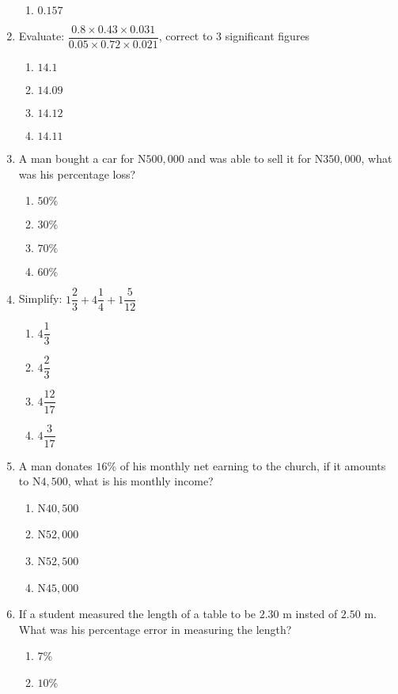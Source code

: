 \begin{multicols}{2}
\begin{enumerate}[label={\arabic*.}]
\begin{enumerate}[label={\Alph*.}]
    \item \(0.157\)
    \end{enumerate}
\item Evaluate: \(\dfrac{0.8 \times 0.43 \times 0.031}{0.05 \times 0.72 \times 0.021}\), correct to 3 significant figures
    \begin{enumerate}[label={\Alph*.}]
    \item \(14.1\)
    \item \(14.09\)
    \item \(14.12\)
    \item \(14.11\)
    \end{enumerate}
\item A man bought a car for N\(500, 000\) and was able to sell it for N\(350, 000\), what was his percentage loss?
    \begin{enumerate}[label={\Alph*.}]
    \item \(50\%\)
    \item \(30\%\)
    \item \(70\%\)
    \item \(60\%\)
    \end{enumerate}
\item Simplify: \(1{\dfrac{2}{3}} + 4{\dfrac{1}{4}} + 1{\dfrac{5}{12}}\)
    \begin{enumerate}[label={\Alph*.}]
    \item \(4\dfrac{1}{3}\)
    \item \(4\dfrac{2}{3}\)
    \item \(4\dfrac{12}{17}\)
    \item \(4\dfrac{3}{17}\)
    \end{enumerate}
\item A man donates \(16\%\) of his monthly net earning to the church, if it amounts to N\(4,500\), 
what is his monthly income? 
    \begin{enumerate}[label={\Alph*.}]
    \item N\(40,500\)
    \item N\(52,000\)
    \item N\(52,500\)
    \item N\(45,000\)
    \end{enumerate}
\item If a student measured the length of a table to be \(2.30\) m insted of \(2.50\) m. 
What was his percentage error in measuring the length?
    \begin{enumerate}[label={\Alph*.}]
    \item \(7\)\%
    \item \(10\)\%

\end{enumerate}
\end{enumerate}
\end{multicols}

